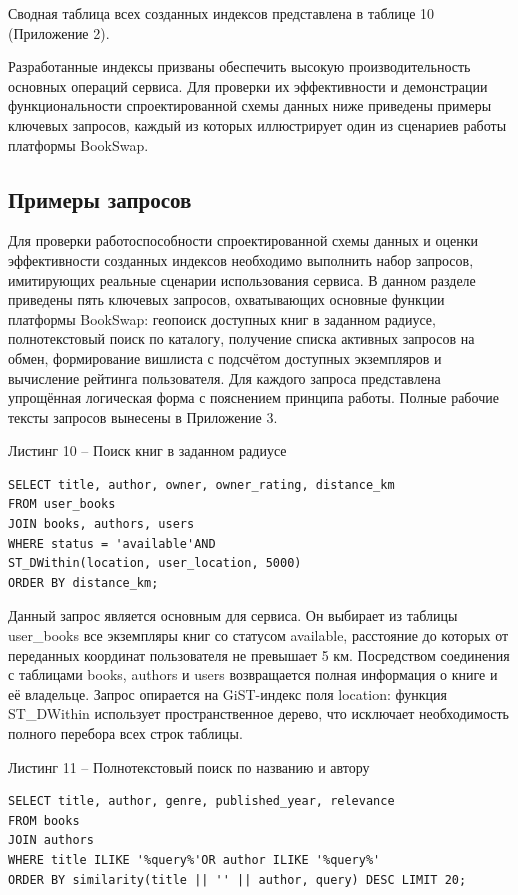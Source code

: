 \documentclass[14pt,a4paper]{extarticle}
\begin{document}
Сводная таблица всех созданных индексов представлена в таблице 10
(Приложение 2).

Разработанные индексы призваны обеспечить высокую производительность
основных операций сервиса. Для проверки их эффективности и демонстрации
функциональности спроектированной схемы данных ниже приведены примеры
ключевых запросов, каждый из которых иллюстрирует один из сценариев
работы платформы BookSwap.

\subsection{Примеры запросов}

Для проверки работоспособности спроектированной схемы данных и оценки
эффективности созданных индексов необходимо выполнить набор запросов,
имитирующих реальные сценарии использования сервиса. В данном разделе
приведены пять ключевых запросов, охватывающих основные функции
платформы BookSwap: геопоиск доступных книг в заданном радиусе,
полнотекстовый поиск по каталогу, получение списка активных запросов на
обмен, формирование вишлиста с подсчётом доступных экземпляров и
вычисление рейтинга пользователя. Для каждого запроса представлена
упрощённая логическая форма с пояснением принципа работы. Полные рабочие
тексты запросов вынесены в Приложение 3.

\begin{center}
Листинг 10 -- Поиск книг в заданном радиусе
\end{center}
\begin{lstlisting}
SELECT title, author, owner, owner_rating, distance_km
FROM user_books
JOIN books, authors, users
WHERE status = 'available'AND
ST_DWithin(location, user_location, 5000)
ORDER BY distance_km;
\end{lstlisting}

Данный запрос является основным для сервиса. Он выбирает из таблицы
user\_books все экземпляры книг со статусом available, расстояние до
которых от переданных координат пользователя не превышает 5 км.
Посредством соединения с таблицами books, authors и users возвращается
полная информация о книге и её владельце. Запрос опирается на
GiST-индекс поля location: функция ST\_DWithin использует
пространственное дерево, что исключает необходимость полного перебора
всех строк таблицы.

\begin{center}
Листинг 11 -- Полнотекстовый поиск по названию и автору
\end{center}
\begin{lstlisting}
SELECT title, author, genre, published_year, relevance
FROM books
JOIN authors
WHERE title ILIKE '%query%'OR author ILIKE '%query%'
ORDER BY similarity(title || '' || author, query) DESC LIMIT 20;
\end{lstlisting}
\end{document}

